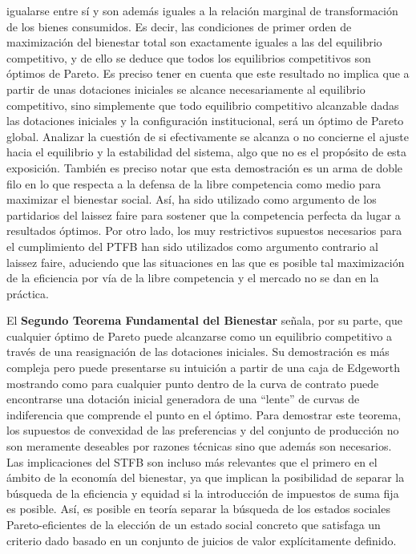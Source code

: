 \documentclass{nuevotema}
\begin{document}
igualarse entre sí y son además iguales a la relación marginal de transformación de los bienes consumidos. Es decir, las condiciones de primer orden de maximización del bienestar total son exactamente iguales a las del equilibrio competitivo, y de ello se deduce que todos los equilibrios competitivos son óptimos de Pareto. Es preciso tener en cuenta que este resultado no implica que a partir de unas dotaciones iniciales se alcance necesariamente al equilibrio competitivo, sino simplemente que todo equilibrio competitivo alcanzable dadas las dotaciones iniciales y la configuración institucional, será un óptimo de Pareto global. Analizar la cuestión de si efectivamente se alcanza o no concierne el ajuste hacia el equilibrio y la estabilidad del sistema, algo que no es el propósito de esta exposición. También es preciso notar que esta demostración es un arma de doble filo en lo que respecta a la defensa de la libre competencia como medio para maximizar el bienestar social. Así, ha sido utilizado como argumento de los partidarios del laissez faire para sostener que la competencia perfecta da lugar a resultados óptimos. Por otro lado, los muy restrictivos supuestos necesarios para el cumplimiento del PTFB han sido utilizados como argumento contrario al laissez faire, aduciendo que las situaciones en las que es posible tal maximización de la eficiencia por vía de la libre competencia y el mercado no se dan en la práctica.

El \textbf{Segundo Teorema Fundamental del Bienestar} señala, por su parte, que cualquier óptimo de Pareto puede alcanzarse como un equilibrio competitivo a través de una reasignación de las dotaciones iniciales. Su demostración es más compleja pero puede presentarse su intuición a partir de una caja de Edgeworth mostrando como para cualquier punto dentro de la curva de contrato puede encontrarse una dotación inicial generadora de una ``lente'' de curvas de indiferencia que comprende el punto en el óptimo. Para demostrar este teorema, los supuestos de convexidad de las preferencias y del conjunto de producción no son meramente deseables por razones técnicas sino que además son necesarios. Las implicaciones del STFB son incluso más relevantes que el primero en el ámbito de la economía del bienestar, ya que implican la posibilidad de separar la búsqueda de la eficiencia y equidad si la introducción de impuestos de suma fija es posible. Así, es posible en teoría separar la búsqueda de los estados sociales Pareto-eficientes de la elección de un estado social concreto que satisfaga un criterio dado basado en un conjunto de juicios de valor explícitamente definido.
\end{document}

